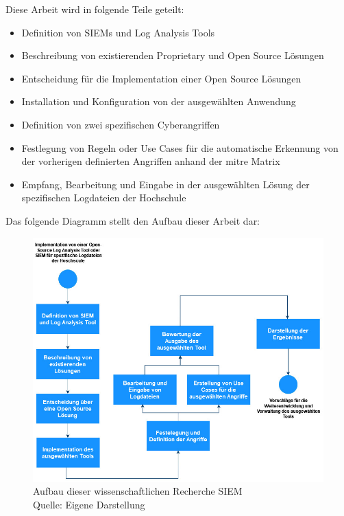Diese Arbeit wird in folgende Teile geteilt: 





\begin{itemize}[noitemsep]
   \item	Definition von SIEMs und Log Analysis Tools 
   \item	Beschreibung von existierenden Proprietary und Open Source Lösungen 
   \item	Entscheidung für die Implementation einer Open Source Lösungen 
   \item	Installation und Konfiguration von der ausgewählten Anwendung 
   \item	Definition von zwei spezifischen Cyberangriffen 
   \item	Festlegung von Regeln oder Use Cases für die automatische Erkennung von der vorherigen definierten Angriffen anhand der \gls{mitre} Matrix 
   \item	Empfang, Bearbeitung und Eingabe in der ausgewählten Lösung der spezifischen Logdateien der Hochschule 
\end{itemize}

Das folgende Diagramm stellt den Aufbau dieser Arbeit dar:

\begin{figure}[H]
   \centering
   \includegraphics[width=1\textwidth]{assets/1_p1.jpg}
   \caption{Aufbau dieser wissenschaftlichen Recherche \gls{SIEM} \\Quelle: Eigene Darstellung }
   \centering
\end{figure}

